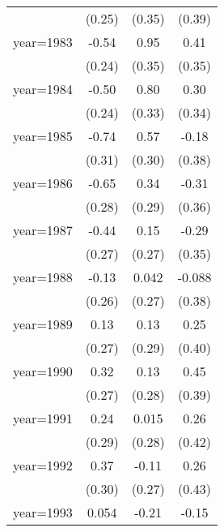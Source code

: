 \begin{sidewaystable}[htbp]
\begin{tabular}{l*{3}{c}}
                &   (0.25)         &   (0.35)         &   (0.39)         \\
\addlinespace
year=1983       &    -0.54\sym{**} &     0.95\sym{***}&     0.41         \\
                &   (0.24)         &   (0.35)         &   (0.35)         \\
\addlinespace
year=1984       &    -0.50\sym{**} &     0.80\sym{**} &     0.30         \\
                &   (0.24)         &   (0.33)         &   (0.34)         \\
\addlinespace
year=1985       &    -0.74\sym{**} &     0.57\sym{*}  &    -0.18         \\
                &   (0.31)         &   (0.30)         &   (0.38)         \\
\addlinespace
year=1986       &    -0.65\sym{**} &     0.34         &    -0.31         \\
                &   (0.28)         &   (0.29)         &   (0.36)         \\
\addlinespace
year=1987       &    -0.44         &     0.15         &    -0.29         \\
                &   (0.27)         &   (0.27)         &   (0.35)         \\
\addlinespace
year=1988       &    -0.13         &    0.042         &   -0.088         \\
                &   (0.26)         &   (0.27)         &   (0.38)         \\
\addlinespace
year=1989       &     0.13         &     0.13         &     0.25         \\
                &   (0.27)         &   (0.29)         &   (0.40)         \\
\addlinespace
year=1990       &     0.32         &     0.13         &     0.45         \\
                &   (0.27)         &   (0.28)         &   (0.39)         \\
\addlinespace
year=1991       &     0.24         &    0.015         &     0.26         \\
                &   (0.29)         &   (0.28)         &   (0.42)         \\
\addlinespace
year=1992       &     0.37         &    -0.11         &     0.26         \\
                &   (0.30)         &   (0.27)         &   (0.43)         \\
\addlinespace
year=1993       &    0.054         &    -0.21         &    -0.15         \\

\end{tabular}
\end{sidewaystable}

